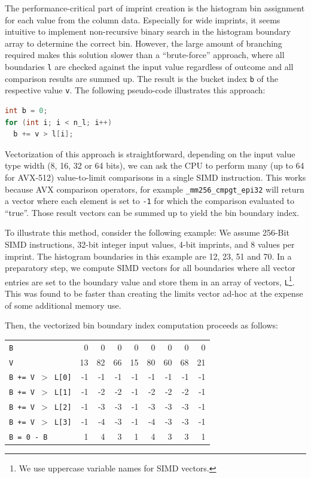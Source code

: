 \documentclass[sigconf]{acmart}
\begin{document}
The performance-critical part of imprint creation is the histogram bin assignment for each value from the column data. Especially for wide imprints, it seems intuitive to implement non-recursive binary search in the histogram boundary array to determine the correct bin. However, the large amount of branching required makes this solution slower than a ``brute-force'' approach, where all boundaries \texttt{l} are checked against the input value regardless of outcome and all comparison results are summed up. The result is the bucket index \texttt{b} of the respective value \texttt{v}. The following pseudo-code illustrates this approach:

\begin{lstlisting}[language=c]
int b = 0;
for (int i; i < n_l; i++)
  b += v > l[i];
\end{lstlisting}

Vectorization of this approach is straightforward, depending on the input value type width (8, 16, 32 or 64 bits), we can ask the CPU to perform many (up to 64 for AVX-512) value-to-limit comparisons in a single SIMD instruction. This works because AVX comparison operators, for example \texttt{\_mm256\_cmpgt\_epi32} will return a vector where each element is set to \texttt{-1} for which the comparison evaluated to ``true''. Those result vectors can be summed up to yield the bin boundary index.

To illustrate this method, consider the following example: We assume 256-Bit SIMD instructions, 32-bit integer input values, 4-bit imprints, and 8 values per imprint. The histogram boundaries in this example are 12, 23, 51 and 70. In a preparatory step, we compute SIMD vectors for all boundaries where all vector entries are set to the boundary value and store them in an array of vectors, \texttt{L}\footnote{We use uppercase variable names for SIMD vectors.}. This was found to be faster than creating the limits vector ad-hoc at the expense of some additional memory use. 

Then, the vectorized bin boundary index computation proceeds as follows:

\bigskip

\begin{tabular}{l|rrrrrrrr}
\texttt{B}             &  0 &  0 & 0 & 0 & 0 & 0 & 0 & 0 \\
\texttt{V}             & 13 & 82 & 66 & 15 & 80 & 60 & 68 & 21 \\
\hline
\texttt{B += V $>$ L[0]} & -1 & -1 & -1 & -1 & -1 & -1 & -1 & -1 \\
\texttt{B += V $>$ L[1]} & -1 & -2 & -2 & -1 & -2 & -2 & -2 & -1 \\
\texttt{B += V $>$ L[2]} & -1 & -3 & -3 & -1 & -3 & -3 & -3 & -1 \\
\texttt{B += V $>$ L[3]} & -1 & -4 & -3 & -1 & -4 & -3 & -3 & -1 \\
\hline
\texttt{B = 0 - B}    &  1 &  4 &  3 &  1 &  4  & 3 &  3 &  1 \\
\end{tabular}
\end{document}
